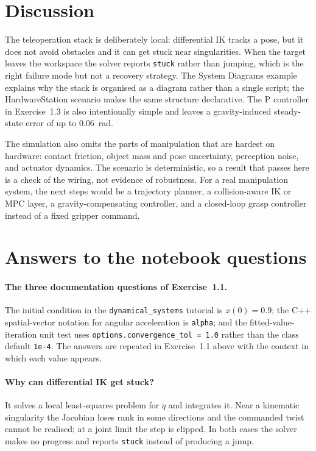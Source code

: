 \documentclass[11pt]{report}
\begin{document}
\section{Discussion}

The teleoperation stack is deliberately local: differential IK tracks a pose,
but it does not avoid obstacles and it can get stuck near singularities.  When
the target leaves the workspace the solver reports \texttt{stuck} rather than
jumping, which is the right failure mode but not a recovery strategy.  The
System Diagrams example explains why the stack is organised as a diagram rather
than a single script; the HardwareStation scenario makes the same structure
declarative.  The P controller in Exercise~1.3 is also intentionally simple and
leaves a gravity-induced steady-state error of up to 0.06~rad.

The simulation also omits the parts of manipulation that are hardest on
hardware: contact friction, object mass and pose uncertainty, perception noise,
and actuator dynamics.  The scenario is deterministic, so a result that passes
here is a check of the wiring, not evidence of robustness.  For a real
manipulation system, the next steps would be a trajectory planner, a
collision-aware IK or MPC layer, a gravity-compensating controller, and a
closed-loop grasp controller instead of a fixed gripper command.

\section{Answers to the notebook questions}

\paragraph{The three documentation questions of Exercise~1.1.}
\begin{sloppypar}
The initial condition in the \texttt{dynamical\_systems} tutorial is
$x(0)=0.9$; the C++ spatial-vector notation for angular acceleration is
\texttt{alpha}; and the fitted-value-iteration unit test uses
\texttt{options.convergence\_tol = 1.0} rather than the class default
\texttt{1e-4}.  The answers are repeated in Exercise~1.1 above with the
context in which each value appears.
\end{sloppypar}

\paragraph{Why can differential IK get stuck?}  It solves a local least-squares
problem for $\dot q$ and integrates it.  Near a kinematic singularity the
Jacobian loses rank in some directions and the commanded twist cannot be
realised; at a joint limit the step is clipped.  In both cases the solver makes
no progress and reports \texttt{stuck} instead of producing a jump.
\end{document}
